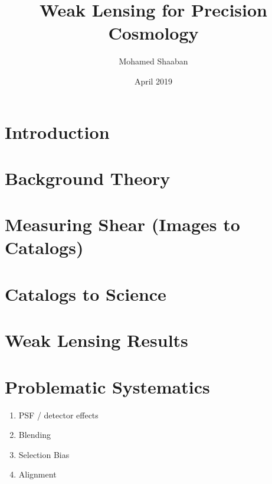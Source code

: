 \documentclass{article}
\title{Weak Lensing for Precision Cosmology}
\author{Mohamed Shaaban}
\date{April 2019}
\begin{document}
\maketitle

\section{Introduction}


\section{Background Theory}



\section{Measuring Shear (Images to Catalogs)}


\section{Catalogs to Science}


\section{Weak Lensing Results}
\cite{Subaru_2019}

\section{Problematic Systematics}
\cite{massey_2013}

\begin{enumerate}
    \item PSF / detector effects 
    \item Blending
    \item Selection Bias
    \item Alignment 
\end{enumerate}



\end{document}

